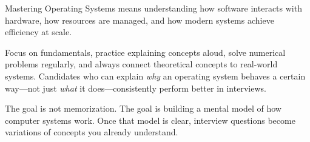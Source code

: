 Mastering Operating Systems means understanding how software interacts with hardware, how resources are managed, and how modern systems achieve efficiency at scale.

Focus on fundamentals, practice explaining concepts aloud, solve numerical problems regularly, and always connect theoretical concepts to real-world systems. Candidates who can explain \emph{why} an operating system behaves a certain way—not just \emph{what} it does—consistently perform better in interviews.

The goal is not memorization. The goal is building a mental model of how computer systems work. Once that model is clear, interview questions become variations of concepts you already understand.
